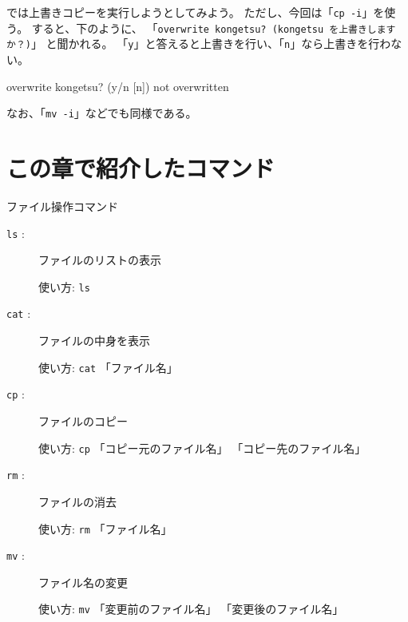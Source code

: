 \begin{progls}
%
\end{progls}

では上書きコピーを実行しようとしてみよう。
ただし、今回は「\texttt{cp -i}」を使う。
すると、下のように、
「\texttt{overwrite kongetsu? (kongetsu を上書きしますか？)}」
と聞かれる。
「\texttt{y}」と答えると上書きを行い、「\texttt{n}」なら上書きを行わない。

\begin{progls}
overwrite kongetsu? (y/n [n]) 
not overwritten
%
\end{progls}

なお、「\texttt{mv -i}」などでも同様である。

\section*{この章で紹介したコマンド}

\begin{center}
\begin{minipage}{13cm}
\begin{itembox}[l]{ファイル操作コマンド}
\begin{description}
\item[\texttt{ls} :] ファイルのリストの表示

使い方: \texttt{ls}
\item[\texttt{cat} :] ファイルの中身を表示

使い方: \texttt{cat} 「ファイル名」
\item[\texttt{cp} :] ファイルのコピー

使い方: \texttt{cp} 「コピー元のファイル名」 「コピー先のファイル名」
\item[\texttt{rm} :] ファイルの消去

使い方: \texttt{rm} 「ファイル名」
\item[\texttt{mv} :] ファイル名の変更

使い方: \texttt{mv} 「変更前のファイル名」 「変更後のファイル名」
\end{description}
\end{itembox}
\end{minipage}
\end{center}
